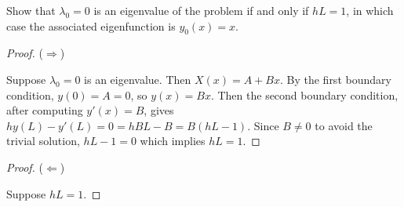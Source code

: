 Show that $\lambda_0 = 0$ is an eigenvalue of the problem if and only if $hL = 1$, in which
case the associated eigenfunction is $y_0(x) = x$.

\begin{proof} ($\Longrightarrow$) 
    
    \nl Suppose $\lambda_0 = 0$ is an eigenvalue. Then $X(x) = A + Bx$. By the first boundary condition, $y(0) = A = 0$, so $y(x) = Bx$. Then the second boundary condition, after computing $y'(x) = B$, gives $h y(L) - y'(L) = 0 = h B L - B = B(hL - 1)$. Since $B \neq 0$ to avoid the trivial solution, $hL - 1 = 0$ which implies $hL = 1$.
\end{proof}


\begin{proof}($\Longleftarrow$) 
    
    \nl Suppose $hL = 1$.
\end{proof}